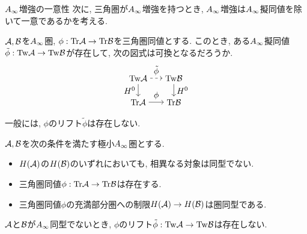 \documentclass[aspectratio=169, dvipdfmx, 8pt, notheorems, uplatex]{beamer}
\begin{document}
\begin{frame}{$A_\infty$増強の一意性}
  次に, 三角圏が$A_\infty$増強を持つとき, $A_\infty$増強は$A_\infty$擬同値を除いて一意であるかを考える. 

  \begin{question}
    $\mathcal{A}, \mathcal{B}$を$A_\infty$圏, $\phi : \mathrm{Tr}\mathcal{A} \to \mathrm{Tr}\mathcal{B}$を三角圏同値とする. 
    このとき, ある$A_\infty$擬同値$\tilde{\phi} : \mathrm{Tw}\mathcal{A} \to \mathrm{Tw}\mathcal{B}$が存在して, 次の図式は可換となるだろうか. 
    \[
      \begin{tikzpicture}[auto,->]
        \node (TwA) at (0,1) {$\Tw\A$}; 
        \node (TwB) at (1.5,1) {$\Tw\B$};
        \node (TrA) at (0,0) {$\Tr\A$}; 
        \node (TrB) at (1.5,0) {$\Tr\B$};
        \draw[dashed] (TwA) -- node {$\tilde{\phi}$} (TwB);
        \draw (TwA) -- node[swap] {$H^0$} (TrA);
        \draw (TwB) -- node {$H^0$} (TrB);
        \draw (TrA) -- node {$\phi$} (TrB);
        \end{tikzpicture}        
    \] 
  \end{question} 

  一般には, $\phi$のリフト$\tilde{\phi}$は存在しない. 

  \begin{example}
    $\mathcal{A}, \mathcal{B}$を次の条件を満たす極小$A_\infty$圏とする.
    \begin{itemize}
      \item $H(\mathcal{A})$の$H(\mathcal{B})$のいずれにおいても, 相異なる対象は同型でない. 
      \item 三角圏同値$\phi : \mathrm{Tr}\mathcal{A} \to \mathrm{Tr}\mathcal{B}$は存在する.
      \item 三角圏同値$\phi$の充満部分圏への制限$H(\mathcal{A}) \to H(\mathcal{B})$は圏同型である.
    \end{itemize}
  $\mathcal{A}$と$\mathcal{B}$が$A_\infty$同型でないとき, $\phi$のリフト$\tilde{\phi} : \mathrm{Tw}\mathcal{A} \to \mathrm{Tw}\mathcal{B}$は存在しない.
  \end{example}
\end{frame}



\end{document}
